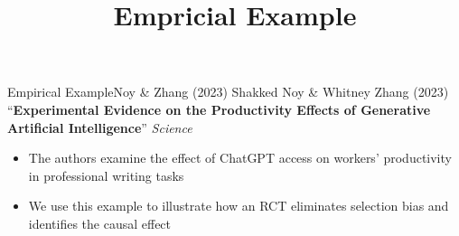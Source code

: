 \documentclass[hyperref={pdfpagelabels=false}]{beamer}
\begin{document}
\title[]  
{Empricial Example}


\author 
{}

\institute{}






\date
{}


\begin{frame}{}
	\titlepage
\end{frame}
	
    

	
\begin{frame}{Empirical Example}{Noy \& Zhang (2023)}
	Shakked Noy \& Whitney Zhang (2023) ``\textbf{Experimental Evidence on the Productivity Effects of Generative Artificial Intelligence}'' \textit{Science}
	\begin{itemize}
		\vspace{0.2cm}
		\item The authors examine the effect of ChatGPT access on workers' productivity in professional writing tasks
		\vspace{0.2cm}
		\item We use this example to illustrate how an RCT eliminates selection bias and identifies the causal effect
	\end{itemize}
\end{frame}
\end{document}

